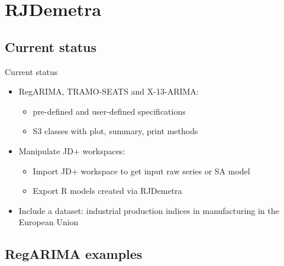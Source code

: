 \documentclass[10pt,xcolor=table,color={dvipsnames,usenames},ignorenonframetext,usepdftitle=false,french]{beamer}
\providecommand{\tightlist}{%
  \setlength{\parskip}{0pt}
  }
\begin{document}
\hypertarget{rjdemetra}{%
\section{RJDemetra}\label{rjdemetra}}

\hypertarget{current-status}{%
\subsection{Current status}\label{current-status}}

\begin{frame}{Current status}
\protect\hypertarget{current-status-1}{}

\begin{itemize}
\tightlist
\item
  RegARIMA, TRAMO-SEATS and X-13-ARIMA:

  \begin{itemize}
  \tightlist
  \item
    pre-defined and user-defined specifications\\
  \item
    S3 classes with plot, summary, print methods
  \end{itemize}
\item
  Manipulate JD+ workspaces:

  \begin{itemize}
  \tightlist
  \item
    Import JD+ workspace to get input raw series or SA model
  \item
    Export R models created via RJDemetra
  \end{itemize}
\item
  Include a dataset: industrial production indices in manufacturing in
  the European Union
\end{itemize}

\end{frame}

\hypertarget{regarima-examples}{%
\subsection{RegARIMA examples}\label{regarima-examples}}
\end{document}
